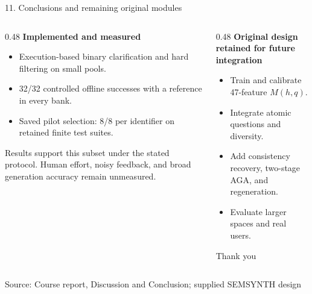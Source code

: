 \documentclass[aspectratio=169,10pt]{beamer}
\newcommand{\source}[1]{\par\vfill{\scriptsize\color{gray}Source: #1\par}}
\begin{document}
\begin{frame}{11. Conclusions and remaining original modules}
  \begin{columns}[T]
    \begin{column}{0.48\textwidth}
      \textbf{Implemented and measured}
      \begin{itemize}
        \item Execution-based binary clarification and hard filtering on small pools.
        \item 32/32 controlled offline successes with a reference in every bank.
        \item Saved pilot selection: 8/8 per identifier on retained finite test suites.
      \end{itemize}
      \par\medskip
      Results support this subset under the stated protocol. Human effort, noisy feedback, and broad generation accuracy remain unmeasured.
    \end{column}
    \begin{column}{0.48\textwidth}
      \textbf{Original design retained for future integration}
      \begin{itemize}
        \item Train and calibrate 47-feature $M(h,q)$.
        \item Integrate atomic questions and diversity.
        \item Add consistency recovery, two-stage AGA, and regeneration.
        \item Evaluate larger spaces and real users.
      \end{itemize}
      \par\medskip
      \centering\Large Thank you
    \end{column}
  \end{columns}
  \source{Course report, Discussion and Conclusion; supplied SEMSYNTH design}
\end{frame}
\end{document}
